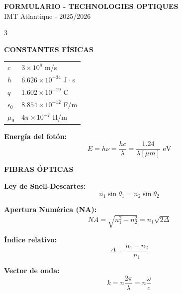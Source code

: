 \documentclass[10pt,a4paper,landscape]{article}
\newcommand{\secbox}[1]{\colorbox{blue!20}{\textbf{#1}}}
\begin{document}
\begin{center}
\LARGE{\textbf{FORMULARIO - TECHNOLOGIES OPTIQUES}}\\
\large{IMT Atlantique - 2025/2026}
\end{center}

\begin{multicols}{3}
\small

\secbox{CONSTANTES FÍSICAS}

\begin{tabular}{ll}
$c$ & $3 \times 10^8$ m/s \\
$h$ & $6.626 \times 10^{-34}$ J·s \\
$q$ & $1.602 \times 10^{-19}$ C \\
$\epsilon_0$ & $8.854 \times 10^{-12}$ F/m \\
$\mu_0$ & $4\pi \times 10^{-7}$ H/m \\
\end{tabular}

\vspace{0.3cm}
\textbf{Energía del fotón:}
\begin{equation*}
\boxed{E = h\nu = \frac{hc}{\lambda} = \frac{1.24}{\lambda[\mu m]} \text{ eV}}
\end{equation*}

\secbox{FIBRAS ÓPTICAS}

\textbf{Ley de Snell-Descartes:}
\begin{equation*}
\boxed{n_1 \sin\theta_1 = n_2 \sin\theta_2}
\end{equation*}

\textbf{Apertura Numérica (NA):}
\begin{equation*}
\boxed{NA = \sqrt{n_1^2 - n_2^2} = n_1\sqrt{2\Delta}}
\end{equation*}

\textbf{Índice relativo:}
\begin{equation*}
\boxed{\Delta = \frac{n_1 - n_2}{n_1}}
\end{equation*}

\textbf{Vector de onda:}
\begin{equation*}
\boxed{k = n\frac{2\pi}{\lambda} = n\frac{\omega}{c}}
\end{equation*}


\end{multicols}
\end{document}
